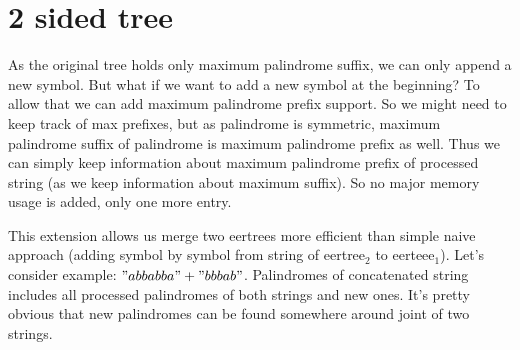 \section{2 sided tree}
As the original tree holds only maximum palindrome suffix, we can only append a new symbol. But what if we want to add a new symbol at the beginning? To allow that we can add maximum palindrome prefix support. So we might need to keep track of max prefixes, but as palindrome is symmetric, maximum palindrome suffix of palindrome is maximum palindrome prefix as well. Thus we can simply keep information about maximum palindrome prefix of processed string (as we keep information about maximum suffix). So no major memory usage is added, only one more entry.

This extension allows us merge two eertrees more efficient than simple naive approach (adding symbol by symbol from string of eertree$_2$ to eerteee$_1$). Let's consider example: $"abbabba" + "bbbab"$.
Palindromes of concatenated string includes all processed palindromes of both strings and new ones. It's pretty obvious that new palindromes can be found somewhere around joint of two strings. 

